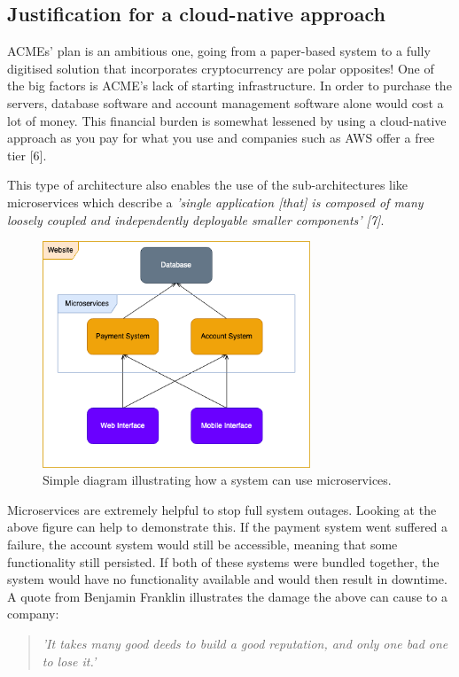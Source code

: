   \subsection{Justification for a cloud-native approach}
  ACMEs' plan is an ambitious one, going from a paper-based system to a fully digitised solution that incorporates cryptocurrency are polar opposites! One of 
  the big factors is ACME's lack of starting infrastructure. In order to purchase the servers, database software and account management software alone would
  cost a lot of money. This financial burden is somewhat lessened by using a cloud-native approach as you pay for what you use and companies such as AWS offer
  a free tier [6].
  
  This type of architecture also enables the use of the sub-architectures like microservices which describe a \textit{'single application [that] is 
  composed of many loosely coupled and independently deployable smaller components' [7]}.

  \begin{figure}[H]
    \centering
    \includegraphics[width=8cm]{assets/microservices.drawio.png}
    \caption{Simple diagram illustrating how a system can use microservices.}
    \label{fig:microservices}
  \end{figure}

  Microservices are extremely helpful to stop full system outages. Looking at the above figure can help to demonstrate this. If the payment system went
  suffered a failure, the account system would still be accessible, meaning that some functionality still persisted. If both of these systems were bundled
  together, the system would have no functionality available and would then result in downtime. A quote from Benjamin Franklin illustrates the damage the 
  above can cause to a company:

  \begin{quote}
    \textit{'It takes many good deeds to build a good reputation, and only one bad one to lose it.'}
  \end{quote}

